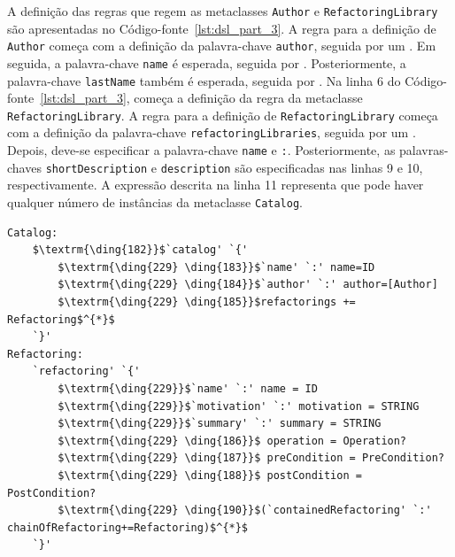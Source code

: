 A definição das regras que regem as metaclasses \texttt{Author} e \texttt{RefactoringLibrary} são apresentadas no Código-fonte~\ref{lst:dsl_part_3}. A regra para a definição de \texttt{Author} começa com a definição da palavra-chave \texttt{author}, seguida por um \aspas{\{}. Em seguida, a palavra-chave \texttt{name} é esperada, seguida por \aspas{\texttt{:}} . Posteriormente, a palavra-chave \texttt{lastName} também é esperada, seguida por \aspas{\texttt{:}} . Na linha 6 do Código-fonte~\ref{lst:dsl_part_3}, começa a definição da regra da metaclasse \texttt{RefactoringLibrary}. A regra para a definição de \texttt{RefactoringLibrary} começa com a definição da palavra-chave \texttt{refactoringLibraries}, seguida por um \aspas{\{}. Depois, deve-se especificar a palavra-chave \texttt{name} e \texttt{:}. Posteriormente, as palavras-chaves \texttt{shortDescription} e \texttt{description} são especificadas nas linhas 9 e 10, respectivamente. A expressão descrita na linha 11 representa que pode haver qualquer número de instâncias da metaclasse \texttt{Catalog}.

\begin{lstlisting}[language=Xtext, frame=single, basicstyle=\scriptsize, mathescape=true, label={lst:dsl_part_4}, caption={Gramática da DSL - parte 4}]
Catalog:
	$\textrm{\ding{182}}$`catalog' `{' 
		$\textrm{\ding{229} \ding{183}}$`name' `:' name=ID
		$\textrm{\ding{229} \ding{184}}$`author' `:' author=[Author]
		$\textrm{\ding{229} \ding{185}}$refactorings += Refactoring$^{*}$
	`}'
Refactoring:
	`refactoring' `{' 
		$\textrm{\ding{229}}$`name' `:' name = ID
		$\textrm{\ding{229}}$`motivation' `:' motivation = STRING
		$\textrm{\ding{229}}$`summary' `:' summary = STRING
		$\textrm{\ding{229} \ding{186}}$ operation = Operation?
		$\textrm{\ding{229} \ding{187}}$ preCondition = PreCondition?
		$\textrm{\ding{229} \ding{188}}$ postCondition = PostCondition?
		$\textrm{\ding{229} \ding{190}}$(`containedRefactoring' `:' chainOfRefactoring+=Refactoring)$^{*}$
	`}'
\end{lstlisting}

